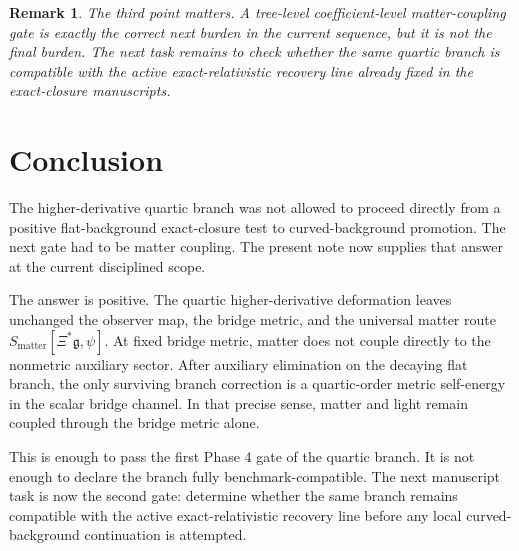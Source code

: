 \documentclass[11pt]{article}
\newcommand{\BridgeMetric}{\mathfrak{g}}
\newtheorem{remark}{Remark}
\begin{document}
\begin{remark}
The third point matters. A tree-level coefficient-level matter-coupling gate is exactly the correct next burden in the current sequence, but it is not the final burden. The next task remains to check whether the same quartic branch is compatible with the active exact-relativistic recovery line already fixed in the exact-closure manuscripts.
\end{remark}

\section{Conclusion}

The higher-derivative quartic branch was not allowed to proceed directly from a positive flat-background exact-closure test to curved-background promotion. The next gate had to be matter coupling. The present note now supplies that answer at the current disciplined scope.

The answer is positive. The quartic higher-derivative deformation leaves unchanged the observer map, the bridge metric, and the universal matter route \(S_{\mathrm{matter}}[\Xi^*\BridgeMetric,\psi]\). At fixed bridge metric, matter does not couple directly to the nonmetric auxiliary sector. After auxiliary elimination on the decaying flat branch, the only surviving branch correction is a quartic-order metric self-energy in the scalar bridge channel. In that precise sense, matter and light remain coupled through the bridge metric alone.

This is enough to pass the first Phase 4 gate of the quartic branch. It is not enough to declare the branch fully benchmark-compatible. The next manuscript task is now the second gate: determine whether the same branch remains compatible with the active exact-relativistic recovery line before any local curved-background continuation is attempted.
\end{document}
